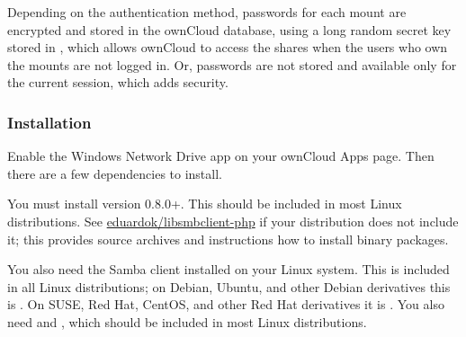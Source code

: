 \documentclass[letterpaper,10pt,english]{sphinxmanual}
\begin{document}
Depending on the authentication method, passwords for each mount are encrypted
and stored in the ownCloud database, using a long random secret key stored in
, which allows ownCloud to access the shares when the users who
own the mounts are not logged in. Or, passwords are not stored and available
only for the current session, which adds security.


\subsubsection{Installation}
\label{enterprise_external_storage/windows-network-drive_configuration:installation}
Enable the Windows Network Drive app on your ownCloud Apps page. Then there are
a few dependencies to install.

You must install  version 0.8.0+. This should be included in most Linux distributions. See \href{https://github.com/eduardok/libsmbclient-php}{eduardok/libsmbclient-php} if your distribution does not include it; this provides source archives and instructions how to install binary packages.

You also need the Samba client installed on your Linux system. This is included in
all Linux distributions; on Debian, Ubuntu, and other Debian derivatives this
is . On SUSE, Red Hat, CentOS, and other Red Hat derivatives it is
. You also need  and , which should be included in most Linux distributions.
\end{document}
